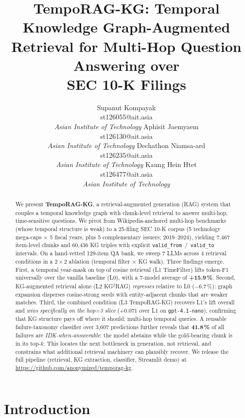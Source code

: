 \documentclass[11pt]{article}
\title{TempoRAG-KG: Temporal Knowledge Graph-Augmented\\
Retrieval for Multi-Hop Question Answering over\\
SEC 10-K Filings}
\author{
  Supanut Kompayak \\
  st126055@ait.asia \\
  \textit{Asian Institute of Technology}
  \And
  Aphisit Jaemyaem \\
  st126130@ait.asia \\
  \textit{Asian Institute of Technology}
  \AND
  Dechathon Niamsa-ard \\
  st126235@ait.asia \\
  \textit{Asian Institute of Technology}
  \And
  Kaung Hein Htet \\
  st126477@ait.asia \\
  \textit{Asian Institute of Technology}
}
\begin{document}
\maketitle

\begin{abstract}
We present \textbf{TempoRAG-KG}, a retrieval-augmented generation (RAG)
system that couples a temporal knowledge graph with chunk-level
retrieval to answer multi-hop, time-sensitive questions. We pivot from
Wikipedia-anchored multi-hop benchmarks (whose temporal structure is
weak) to a 25-filing SEC 10-K corpus (5 technology mega-caps $\times$ 5
fiscal years, plus 5 complementary issuers; 2019--2024), yielding
7{,}467 item-level chunks and 60{,}436 KG triples with explicit
\texttt{valid\_from}~/~\texttt{valid\_to} intervals. On a hand-vetted
129-item QA bank, we sweep 7 LLMs across 4 retrieval conditions in a
$2\times2$ ablation (temporal filter $\times$ KG walk).
Three findings emerge. First, a temporal year-mask on top of cosine
retrieval (L1 TimeFilter) lifts token-F1 universally over the vanilla
baseline (L0), with a 7-model average of \textbf{+15.9\,\%}. Second,
KG-augmented retrieval alone (L2 KG$^{2}$RAG) \emph{regresses} relative
to L0 ($-6.7\,\%$): graph expansion disperses cosine-strong seeds with
entity-adjacent chunks that are weaker matches. Third, the combined
condition (L3 TempoRAG-KG) recovers L1's lift overall and \emph{wins
specifically on the hop=3 slice} ($+0.071$ over L1 on
\texttt{gpt-4.1-nano}), confirming that KG structure pays off where it
should: multi-hop temporal queries.
A reusable failure-taxonomy classifier over 3{,}607 predictions
further reveals that \textbf{41.8\,\%} of all failures are
\emph{IDK-when-answerable}: the model abstains while the gold-bearing
chunk is in its top-$k$. This locates the next bottleneck in generation,
not retrieval, and constrains what additional retrieval machinery can
plausibly recover. We release the full pipeline (retrieval, KG
extraction, classifier, Streamlit demo) at
\url{https://github.com/anonymized/temporag-kg}.
\end{abstract}

\section{Introduction}
\label{sec:intro}
\end{document}
